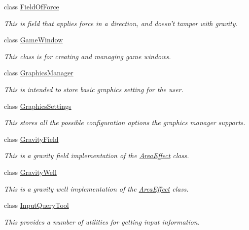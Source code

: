 \begin{DoxyCompactItemize}
class \hyperlink{classphys_1_1FieldOfForce}{FieldOfForce}
\begin{DoxyCompactList}\small\item\em This is field that applies force in a direction, and doesn't tamper with gravity. \item\end{DoxyCompactList}\item 
class \hyperlink{classphys_1_1GameWindow}{GameWindow}
\begin{DoxyCompactList}\small\item\em This class is for creating and managing game windows. \item\end{DoxyCompactList}\item 
class \hyperlink{classphys_1_1GraphicsManager}{GraphicsManager}
\begin{DoxyCompactList}\small\item\em This is intended to store basic graphics setting for the user. \item\end{DoxyCompactList}\item 
class \hyperlink{structphys_1_1GraphicsSettings}{GraphicsSettings}
\begin{DoxyCompactList}\small\item\em This stores all the possible configuration options the graphics manager supports. \item\end{DoxyCompactList}\item 
class \hyperlink{classphys_1_1GravityField}{GravityField}
\begin{DoxyCompactList}\small\item\em This is a gravity field implementation of the \hyperlink{classphys_1_1AreaEffect}{AreaEffect} class. \item\end{DoxyCompactList}\item 
class \hyperlink{classphys_1_1GravityWell}{GravityWell}
\begin{DoxyCompactList}\small\item\em This is a gravity well implementation of the \hyperlink{classphys_1_1AreaEffect}{AreaEffect} class. \item\end{DoxyCompactList}\item 
class \hyperlink{classphys_1_1InputQueryTool}{InputQueryTool}
\begin{DoxyCompactList}\small\item\em This provides a number of utilities for getting input information. \item\end{DoxyCompactList}\item 

\end{DoxyCompactItemize}
